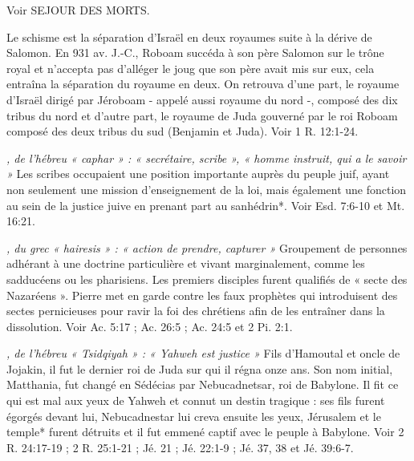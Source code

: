\begin{multicols}{2}
{\textit{}\newline
Voir SEJOUR DES MORTS.

\textit{}\newline
Le schisme est la séparation d'Israël en deux royaumes suite à la dérive de Salomon. En 931 av. J.-C., Roboam succéda à son père Salomon sur le trône royal et n'accepta pas d'alléger le joug que son père avait mis sur eux, cela entraîna la séparation du royaume en deux. On retrouva d'une part, le royaume d'Israël dirigé par Jéroboam - appelé aussi royaume du nord -, composé des dix tribus du nord et d'autre part, le royaume de Juda gouverné par le roi Roboam composé des deux tribus du sud (Benjamin et Juda). Voir 1 R. 12:1-24.

\textit{, de l'hébreu « caphar » : « secrétaire, scribe », « homme instruit, qui a le savoir »}\newline
Les scribes occupaient une position importante auprès du peuple juif, ayant non seulement une mission d'enseignement de la loi, mais également une fonction au sein de la justice juive en prenant part au sanhédrin*. Voir Esd. 7:6-10 et Mt. 16:21.

\textit{, du grec « hairesis » : « action de prendre, capturer »}\newline
Groupement de personnes adhérant à une doctrine particulière et vivant marginalement, comme les sadducéens ou les pharisiens. Les premiers disciples furent qualifiés de « secte des Nazaréens ». Pierre met en garde contre les faux prophètes qui introduisent des sectes pernicieuses pour ravir la foi des chrétiens afin de les entraîner dans la dissolution. Voir Ac. 5:17 ; Ac. 26:5 ; Ac. 24:5 et 2 Pi. 2:1.

\textit{, de l'hébreu « Tsidqiyah » : « Yahweh est justice »}\newline
Fils d'Hamoutal et oncle de Jojakin, il fut le dernier roi de Juda sur qui il régna onze ans. Son nom initial, Matthania, fut changé en Sédécias par Nebucadnetsar, roi de Babylone. Il fit ce qui est mal aux yeux de Yahweh et connut un destin tragique : ses fils furent égorgés devant lui, Nebucadnestar lui creva ensuite les yeux, Jérusalem et le temple* furent détruits et il fut emmené captif avec le peuple à Babylone. Voir 2 R. 24:17-19 ; 2 R. 25:1-21 ; Jé. 21 ; Jé. 22:1-9 ; Jé. 37, 38 et Jé. 39:6-7.

}
\end{multicols}
